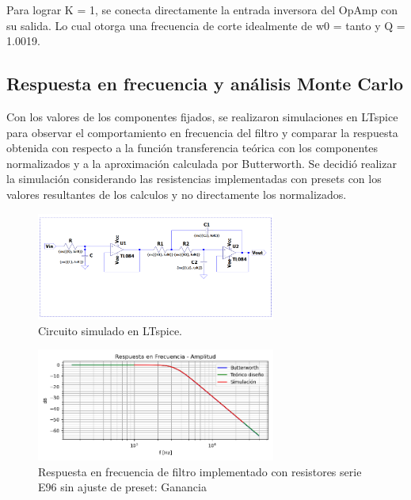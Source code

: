 Para lograr K = 1, se conecta directamente la entrada inversora del OpAmp con su salida. Lo cual otorga una frecuencia de corte idealmente de w0 = tanto y Q = 1.0019. 



\subsection{Respuesta en frecuencia y análisis Monte Carlo}

Con los valores de los componentes fijados, se realizaron simulaciones en LTspice para observar el comportamiento en frecuencia del filtro y comparar la respuesta obtenida con respecto a la función transferencia teórica con los componentes normalizados y a la aproximación calculada por Butterworth. Se decidió realizar la simulación considerando las resistencias implementadas con presets con los valores resultantes de los calculos y no directamente los normalizados. 

\begin{figure}[H]
    \centering
    \includegraphics[width= 0.7\textwidth]{../Ejercicio2-DisenoDeCeldas/1CeldaSallenKey/images/circLTspiceSK.png}
    \caption{Circuito simulado en LTspice.}
    \label{fig:simuSK}
\end{figure}

\begin{figure}[H]
    \centering
    \includegraphics[width= 0.7\textwidth]{../Ejercicio2-DisenoDeCeldas/1CeldaSallenKey/images/SKGain.png}
    \caption{Respuesta en frecuencia de filtro implementado con resistores serie E96 sin ajuste de preset: Ganancia}
    \label{fig:SKGain}
\end{figure}


